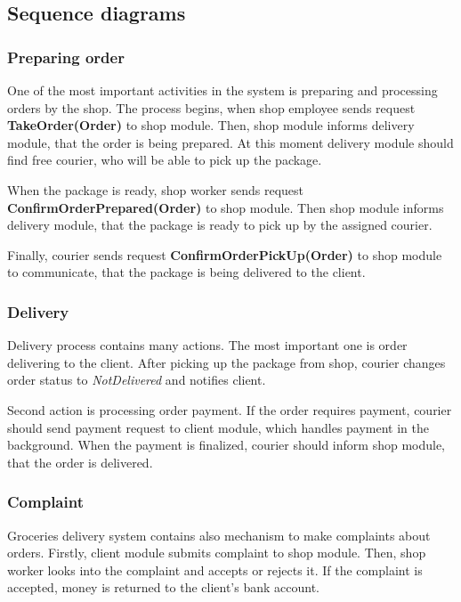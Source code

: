 \documentclass[../main.tex]{subfiles}
\begin{document}
\subsection{Sequence diagrams}
\subsubsection{Preparing order}


One of the most important activities in the system is preparing and processing orders by the shop. The process begins, when shop employee sends request \textbf{TakeOrder(Order)} to shop module. Then, shop module informs delivery module, that the order is being prepared. At this moment delivery module should find free courier, who will be able to pick up the package. 

When the package is ready, shop worker sends request \textbf{ConfirmOrderPrepared(Order)} to shop module. Then shop module informs delivery module, that the package is ready to pick up by the assigned courier. 

Finally, courier sends request \textbf{ConfirmOrderPickUp(Order)} to shop module to communicate, that the package is being delivered to the client. 



\subsubsection{Delivery}

Delivery process contains many actions. The most important one is order delivering to the client. After picking up the package from shop, courier changes order status to \textit{NotDelivered} and notifies client. 

Second action is processing order payment. If the order requires payment, courier should send payment request to client module, which handles payment in the background. When the payment is finalized, courier should inform shop module, that the order is delivered.



\subsubsection{Complaint}

Groceries delivery system contains also mechanism to make complaints about orders. Firstly, client module submits complaint to shop module. Then, shop worker looks into the complaint and accepts or rejects it. If the complaint is accepted, money is returned to the client's bank account.
\end{document}
